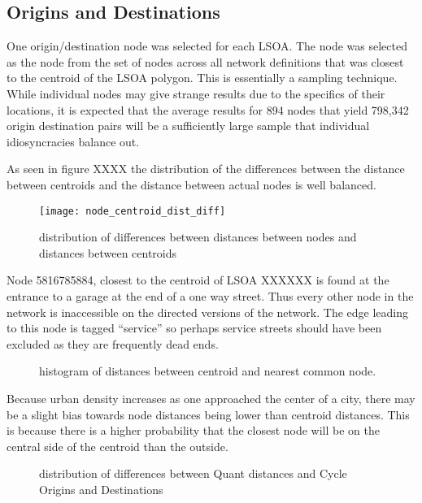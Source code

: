 \subsection{Origins and Destinations}

One origin/destination node was selected for each LSOA. The node was selected as the node from the set of nodes across all network definitions that was closest to the centroid of the LSOA polygon. This is essentially a sampling technique. While individual nodes may give strange results due to the specifics of their locations, it is expected that the average results for 894 nodes that yield 798,342 origin destination pairs will be a sufficiently large sample that individual idiosyncracies balance out. 

As seen in figure XXXX the distribution of the differences between the distance between centroids and the distance between actual nodes is well balanced. 

\begin{figure}
\centering
\texttt{[image: node\_centroid\_dist\_diff]}
\caption{distribution of differences between distances between nodes and distances between centroids}
\label{table:dist_diffs}
\end{figure}

Node 5816785884, closest to the centroid of LSOA XXXXXX is found at the entrance to a garage at the end of a one way street. Thus every other node in the network is inaccessible on the directed versions of the network. The edge leading to this node is tagged ``service'' so perhaps service streets should have been excluded as they are frequently dead ends. 

\begin{figure}
\centering
\caption{histogram of distances between centroid and nearest common node. }
\label{fig:centroid_node_dist_hist}
\end{figure}

Because urban density increases as one approached the center of a city, there may be a slight bias towards node distances being lower than centroid distances. This is because there is a higher probability that the closest node will be on the central side of the centroid than the outside. 

\begin{figure}
\centering
\caption{distribution of differences between Quant distances and Cycle Origins and Destinations}
\label{fig:diff_dist}
\end{figure}


